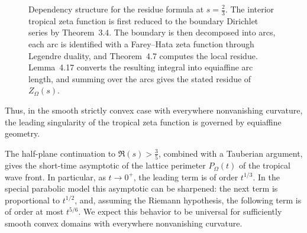 \documentclass[a4paper,american,11pt]{amsart}
\theoremstyle{plain}
\theoremstyle{definition}
\begin{document}
\begin{figure}[p]

\caption{Dependency structure for the residue formula at \(s=\frac23\).
The interior tropical zeta function is first reduced to the boundary
Dirichlet series by Theorem~3.4.  The boundary is then decomposed into
arcs, each arc is identified with a Farey--Hata zeta function through
Legendre duality, and Theorem~4.7 computes the local residue.  Lemma~4.17
converts the resulting integral into equiaffine arc length, and summing over
the arcs gives the stated residue of \(Z_\Omega(s)\).}
\label{fig:residue-dependency}
\end{figure}





Thus, in the smooth strictly convex case with everywhere nonvanishing
curvature, the leading singularity of the tropical zeta function is governed
by equiaffine geometry.

The half-plane continuation to \(\Re(s)>\frac35\), combined with a Tauberian
argument, gives the short-time asymptotic of the lattice perimeter
\(P_\Omega(t)\) of the tropical wave front. In particular, as \(t\to0^+\), the
leading term is of order \(t^{1/3}\). In the special parabolic model this
asymptotic can be sharpened: the next term is proportional to \(t^{1/2}\),
and, assuming the Riemann hypothesis, the following term is of order at most
\(t^{5/6}\). We expect this behavior to be universal for sufficiently smooth
convex domains with everywhere nonvanishing curvature.
\end{document}
